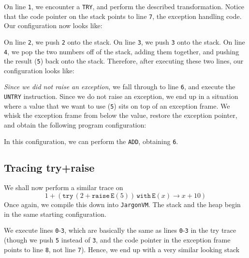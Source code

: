On line \texttt{1}, we encounter a \texttt{TRY}, and perform the described transformation. Notice that the code pointer on the stack points to line \texttt{7}, the exception handling code. Our configuration now looks like:
\begin{center}
\end{center}

On line \texttt{2}, we push \texttt{2} onto the stack. On line \texttt{3}, we push \texttt{3} onto the stack. On line \texttt{4}, we pop the two numbers off of the stack, adding them together, and pushing the result (\texttt{5}) back onto the stack. Therefore, after executing these two lines, our configuration looks like:
\begin{center}
\end{center}

\textit{Since we did not raise an exception}, we fall through to line \texttt{6}, and execute the \texttt{UNTRY} instruction. Since we do not raise an exception, we end up in a situation where a value that we want to use (\texttt{5}) sits on top of an exception frame. We whisk the exception frame from below the value, restore the exception pointer, and obtain the following program configuration:
\begin{center}
\end{center}

In this configuration, we can perform the \texttt{ADD}, obtaining \texttt{6}. 

\subsection{Tracing try+raise}
We shall now perform a similar trace on 
\[ 1+ (\texttt{try} \, (2+\texttt{raise}\, \texttt{E}(5))\, \texttt{with} \, \texttt{E}(x) \to x+10)\]
Once again, we compile this down into \texttt{JargonVM}. The stack and the heap begin in the same starting configuration.

\begin{center}
\end{center}

We execute lines \texttt{0}-\texttt{3}, which are basically the same as lines \texttt{0}-\texttt{3} in the \textsf{try} trace (though we push \texttt{5} instead of \texttt{3}, and the code pointer in the exception frame points to line \texttt{8}, not line \texttt{7}). Hence, we end up with a very similar looking stack

